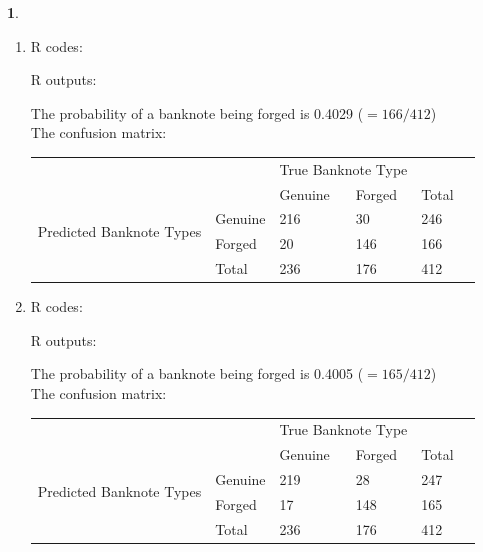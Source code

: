 \documentclass[10pt]{article}
\newtheorem{prob}{\bm{$Problem$}}
\begin{document}
\begin{prob}
\end{prob}
\begin{enumerate}[1)]
\vspace{3mm}

\item
R codes:

\vspace{3mm}
R outputs:

\vspace{3mm}
The probability of a banknote being forged is 0.4029 ($=166/412$)\\
The confusion matrix:\\
\begin{tabular}{llllll}
                                          &         & \multicolumn{2}{l}{True Banknote Type} &       &  \\
                                          &         & Genuine           & Forged             & Total &  \\
\multirow{2}{*}{Predicted Banknote Types} & Genuine & 216               & 30                 & 246   &  \\
                                          & Forged  & 20                & 146                & 166   &  \\
                                          & Total   & 236               & 176                & 412   &
\end{tabular}
\vspace{3mm}

\item
R codes:

\vspace{3mm}
R outputs:

\vspace{3mm}
The probability of a banknote being forged is 0.4005 ($=165/412$)\\
The confusion matrix:\\
\begin{tabular}{llllll}
                                          &         & \multicolumn{2}{l}{True Banknote Type} &       &  \\
                                          &         & Genuine           & Forged             & Total &  \\
\multirow{2}{*}{Predicted Banknote Types} & Genuine & 219               & 28                 & 247   &  \\
                                          & Forged  & 17                & 148                & 165   &  \\
                                          & Total   & 236               & 176                & 412   &
\end{tabular}
\vspace{3mm}


\end{enumerate}
\end{document}
